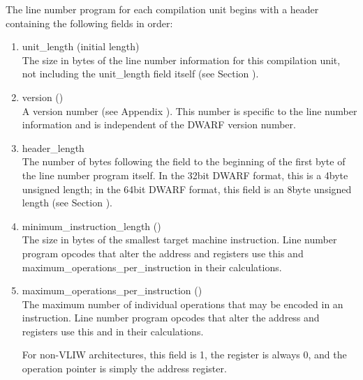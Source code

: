 The line number program for each compilation unit begins with
a header containing the following fields in order:

\begin{enumerate}[1. ]
\item unit\_length (initial length)  \\
The size in bytes of the line number information for this
compilation unit, not including the unit\_length field itself
(see Section ). 

\item version () \\
A version number 
(see Appendix ). 
This number is specific to
the line number information and is independent of the DWARF
version number. 

\item header\_length  \\
The number of bytes following the  field to the
beginning of the first byte of the line number program itself.
In the 32\dash bit DWARF format, this is a 4\dash byte unsigned
length; in the 64\dash bit DWARF format, this field is an
8\dash byte unsigned length 
(see Section ). 

\item minimum\_instruction\_length ()  \\
The size in bytes of the smallest target machine
instruction. Line number program opcodes that alter
the address and  registers use this and
maximum\-\_operations\-\_per\-\_instruction in their calculations. 

\item maximum\_operations\_per\_instruction () \\
The 
maximum number of individual operations that may be
encoded in an instruction. Line number program opcodes
that alter the address and 
 registers use this and
in their calculations.

For non-VLIW
architectures, this field is 1, the  register is always
0, and the operation pointer is simply the address register.


\end{enumerate}
